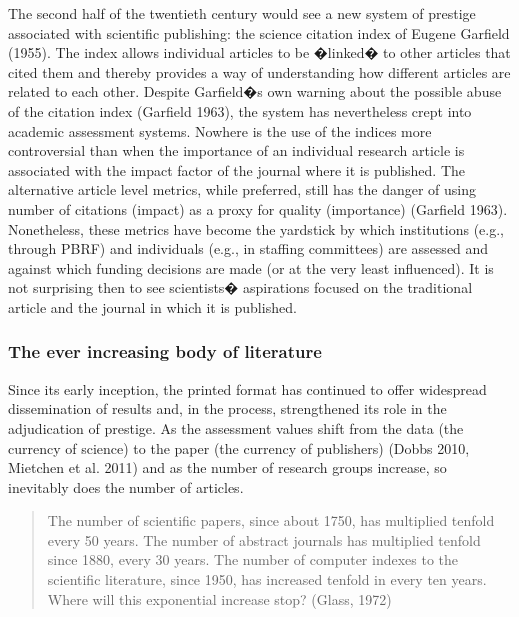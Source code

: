 \documentclass[final,authoryear,3p]{elsarticle-open-drafting}
\begin{document}
The second half of the twentieth century would see a new system of prestige associated with scientific publishing: the science 
citation index of Eugene Garfield (1955). The index allows individual articles to be �linked� to other articles that cited them and 
thereby provides a way of understanding how different articles are related to each other.  Despite Garfield�s own warning about 
the possible abuse of the citation index (Garfield 1963), the system has nevertheless crept into academic assessment systems. 
Nowhere is the use of the indices more controversial than when the importance of an individual research article is associated 
with the impact factor of the journal where it is published. The alternative article level metrics, while preferred, still has the danger 
of using number of citations (impact) as a proxy for quality (importance) (Garfield 1963). Nonetheless, these metrics have 
become the yardstick by which institutions (e.g., through PBRF) 
and individuals (e.g., in staffing committees) are assessed and 
against which funding decisions are made (or at the very least influenced). It is not surprising then to see scientists� aspirations 
focused on the traditional article and the journal in which it is published.

\subsubsection{The ever increasing body of literature}

Since its early inception, the printed format has continued to offer widespread dissemination of results and, in the process, 
strengthened its role in the adjudication of prestige. As the assessment values shift from the data (the currency of science) to the 
paper (the currency of publishers) (Dobbs 2010, Mietchen et al. 2011) and as the number of research groups increase, so 
inevitably does the number of articles.  

\begin{quote}
The number of scientific papers, since about 1750, has multiplied tenfold every 50 years. The number of abstract journals has 
multiplied tenfold since 1880, every 30 years. The number of computer indexes to the scientific literature, since 1950, has 
increased tenfold in every ten years. Where will this exponential increase stop? (Glass, 1972)
\end{quote}
\end{document}
